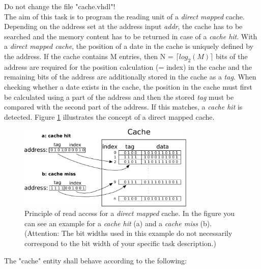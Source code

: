 \documentclass[a4paper,12pt]{article}
\begin{document}
Do not change the file "cache.vhdl"!\\

The aim of this task is to program the reading unit of a \textit{direct mapped} cache. Depending on the address set at the address input \textit{addr}, the cache has to be searched and the memory content has to be returned in case of a \textit{cache hit}. With a \textit{direct mapped cache}, the position of a date in the cache is uniquely defined by the address. If the cache contains M entries, then N = $\lceil log_2(M) \rceil$ bits of the address are required for the position calculation (= index) in the cache and the remaining bits of the address are additionally stored in the cache as a \textit{tag}.
When checking whether a date exists in the cache, the position in the cache must first be calculated using a part of the address and then the stored \textit{tag} must be compared with the second part of the address. If this matches, a \textit{cache hit} is detected. Figure \ref{img_cache} illustrates the concept of a direct mapped cache.


\begin{figure}[h]
\begin{center}
\includegraphics[width=0.75\textwidth]{../static/cache.pdf}
\caption{Principle of read access for a \textit{direct mapped} cache. In the figure you can see an example for a \textit{cache hit} (a) and a \textit{cache miss} (b). \newline (Attention: The bit widths used in this example do not necessarily correspond to the bit width of your specific task description.)}
\label{img_cache}
\end{center}
\end{figure}

The "cache" entity shall behave according to the following:\\
\end{document}
